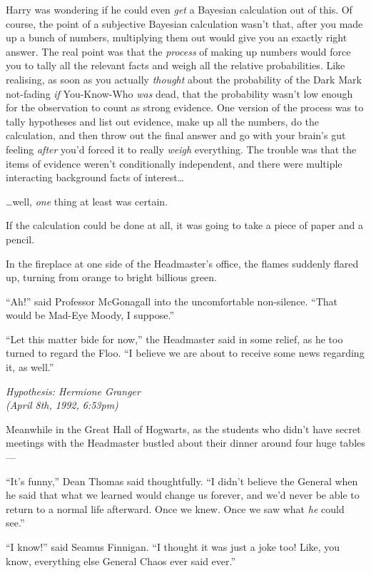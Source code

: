 Harry was wondering if he could even \emph{get} a Bayesian calculation
out of this. Of course, the point of a subjective Bayesian calculation
wasn't that, after you made up a bunch of numbers, multiplying them out
would give you an exactly right answer. The real point was that the
\emph{process} of making up numbers would force you to tally all the
relevant facts and weigh all the relative probabilities. Like realising,
as soon as you actually \emph{thought} about the probability of the Dark
Mark not-fading \emph{if} You-Know-Who \emph{was} dead, that the
probability wasn't low enough for the observation to count as strong
evidence. One version of the process was to tally hypotheses and list
out evidence, make up all the numbers, do the calculation, and then
throw out the final answer and go with your brain's gut feeling
\emph{after} you'd forced it to really \emph{weigh} everything. The
trouble was that the items of evidence weren't conditionally
independent, and there were multiple interacting background facts of
interest\ldots{}

\ldots{}well, \emph{one} thing at least was certain.

If the calculation could be done at all, it was going to take a piece of
paper and a pencil.

In the fireplace at one side of the Headmaster's office, the flames
suddenly flared up, turning from orange to bright billious green.

``Ah!'' said Professor McGonagall into the uncomfortable non-silence.
``That would be Mad-Eye Moody, I suppose.''

``Let this matter bide for now,'' the Headmaster said in some relief, as
he too turned to regard the Floo. ``I believe we are about to receive
some news regarding it, as well.''

\emph{Hypothesis: Hermione Granger}\\\emph{(April 8th, 1992, 6:53pm)}

Meanwhile in the Great Hall of Hogwarts, as the students who didn't have
secret meetings with the Headmaster bustled about their dinner around
four huge tables---

``It's funny,'' Dean Thomas said thoughtfully. ``I didn't believe the
General when he said that what we learned would change us forever, and
we'd never be able to return to a normal life afterward. Once we knew.
Once we saw what \emph{he} could see.''

``I know!'' said Seamus Finnigan. ``I thought it was just a joke too!
Like, you know, everything else General Chaos ever said ever.''


